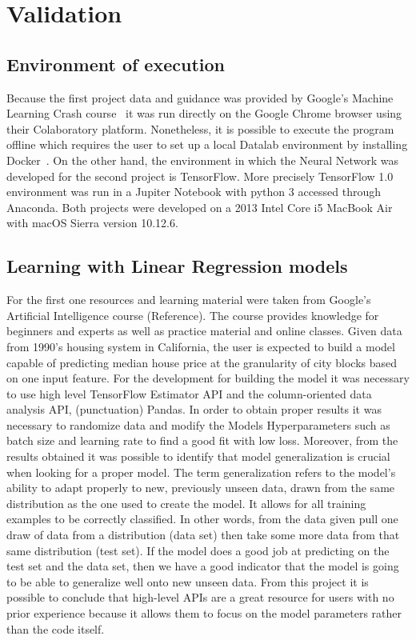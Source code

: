 

\section{Validation}
\label{sec:validation}



\subsection{Environment of execution}
Because the first project data and guidance was provided by Google's Machine Learning Crash course~\cite{mlchrome18}  it was run directly on the Google Chrome browser using their Colaboratory platform. Nonetheless, it is possible to execute the program offline which requires the user to set up a local Datalab environment by installing Docker~\cite{docker18}.   
On the other hand, the environment in which the Neural Network was developed for the second  project is TensorFlow. More precisely TensorFlow 1.0 environment was run in a Jupiter Notebook with python 3 accessed through Anaconda. 
Both projects were developed on a 2013 Intel Core i5 MacBook Air with macOS Sierra version 10.12.6.

\subsection{Learning with Linear Regression models}

For the first one resources and learning material were taken from Google’s Artificial Intelligence course (Reference).  The course provides knowledge for beginners and experts as well as practice material and online classes. Given data from 1990’s housing system in California, the user is expected to build a model capable of predicting median house price at the granularity of city blocks based on one input feature. For the development for building the model it was necessary to use high level TensorFlow Estimator API and the column-oriented data analysis API, (punctuation) Pandas.  In order to obtain proper results it was necessary to randomize data and modify the Models Hyperparameters such as batch size 
and learning rate to find a good fit with low loss. Moreover, from the results obtained it was possible to identify that model generalization is crucial when looking for a proper model. The term generalization refers to the model’s ability to adapt properly to new, previously unseen data, drawn from the same distribution as the one used to create the model.  It allows for all training examples to be correctly classified. In other words, from the data given pull one draw of data from a distribution (data set) then take some more data from that same distribution (test set). If the model does a good job at predicting on the test set and the data set, then we have a good indicator that the model is going to be able to generalize well onto new unseen data.  From this project it is possible to conclude that high-level APIs are a great resource for users with no prior experience because it allows them to focus on the model parameters rather than the code itself. 


